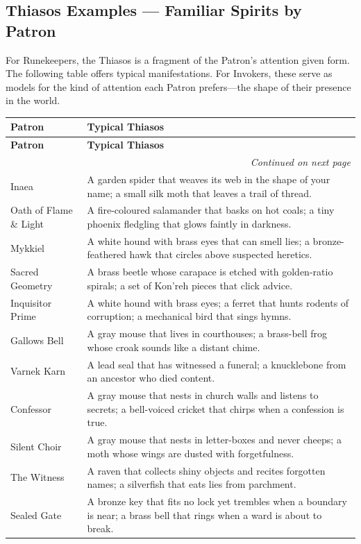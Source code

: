 \clearpage

\subsection{Thiasos Examples --- Familiar Spirits by Patron}
\label{subsec:thiasos-table}

For Runekeepers, the Thiasos is a fragment of the Patron's attention given form. The following table offers typical manifestations. For Invokers, these serve as models for the kind of attention each Patron prefers---the shape of their presence in the world.

\begin{longtable}{@{}p{4.2cm}p{9.4cm}@{}}
  \toprule
  \textbf{Patron} & \textbf{Typical Thiasos} \\
  \midrule
  \endfirsthead
  
  \toprule
  \textbf{Patron} & \textbf{Typical Thiasos} \\
  \midrule
  \endhead
  
  \midrule
  \multicolumn{2}{r}{\emph{Continued on next page}} \\
  \bottomrule
  \endfoot
  
  \bottomrule
  \endlastfoot

  Inaea & A garden spider that weaves its web in the shape of your name; a small silk moth that leaves a trail of thread. \\
  Oath of Flame \& Light & A fire-coloured salamander that basks on hot coals; a tiny phoenix fledgling that glows faintly in darkness. \\
  Mykkiel & A white hound with brass eyes that can smell lies; a bronze-feathered hawk that circles above suspected heretics. \\
  Sacred Geometry & A brass beetle whose carapace is etched with golden-ratio spirals; a set of Kon'reh pieces that click advice. \\
  Inquisitor Prime & A white hound with brass eyes; a ferret that hunts rodents of corruption; a mechanical bird that sings hymns. \\
  Gallows Bell & A gray mouse that lives in courthouses; a brass-bell frog whose croak sounds like a distant chime. \\
  Varnek Karn & A lead seal that has witnessed a funeral; a knucklebone from an ancestor who died content. \\
  Confessor & A gray mouse that nests in church walls and listens to secrets; a bell-voiced cricket that chirps when a confession is true. \\
  Silent Choir & A gray mouse that nests in letter-boxes and never cheeps; a moth whose wings are dusted with forgetfulness. \\
  The Witness & A raven that collects shiny objects and recites forgotten names; a silverfish that eats lies from parchment. \\
  Sealed Gate & A bronze key that fits no lock yet trembles when a boundary is near; a brass bell that rings when a ward is about to break. \\


\end{longtable}
